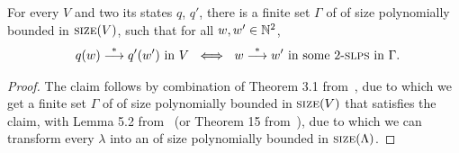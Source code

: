 \begin{appendixproof}[Proof of Lemma~\ref{lem:2vass-sandwich}]

\begin{lemma}\label{lem:two-slps}
For every \dvass $V$ and two its states $q$, $q'$,
there is a finite set $\Gamma$ of \dslps of size polynomially bounded in $\textsc{size}(V)$,
such that for all $w,w'\in\mathbb{N}^2$,
\begin{align*} %
 \ \ q(w) \tran q'(w') \text{ in } V \ \iff \ w \tran w' \text{ in some  \dslps in } \Gamma.
\end{align*}
\end{lemma}

\begin{proof}
The claim follows by combination of
Theorem 3.1 from~\cite{DBLP:journals/jacm/BlondinEFGHLMT21}, due to which we get
a finite set $\Gamma$ of \dlps of size polynomially bounded in $\textsc{size}(V)$ that satisfies the claim,
with Lemma 5.2 from~\cite{DBLP:journals/jacm/BlondinEFGHLMT21} 
(or Theorem 15 from~\cite{DBLP:conf/lics/EnglertLT16}), due to which
we can transform every \dlps $\lambda$ into an \dslps of size polynomially bounded in $\textsc{size}(\Lambda)$.
\end{proof}

%
%


\end{appendixproof}
